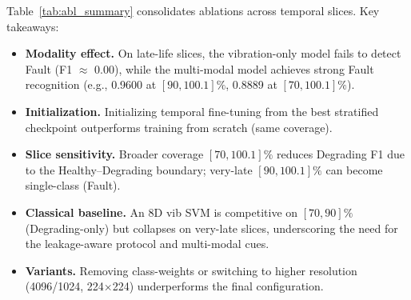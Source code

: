 \documentclass[pdflatex,sn-mathphys-num]{sn-jnl}%
\begin{document}
Table~\ref{tab:abl_summary} consolidates ablations across temporal slices. Key takeaways:
\begin{itemize}
  \item \textbf{Modality effect.} On late-life slices, the vibration-only model fails to detect Fault (F1 $\approx$ 0.00), while the multi-modal model achieves strong Fault recognition (e.g., 0.9600 at $[90,100.1]\%$, 0.8889 at $[70,100.1]\%$).
  \item \textbf{Initialization.} Initializing temporal fine-tuning from the best stratified checkpoint outperforms training from scratch (same coverage).
  \item \textbf{Slice sensitivity.} Broader coverage $[70,100.1]\%$ reduces Degrading F1 due to the Healthy--Degrading boundary; very-late $[90,100.1]\%$ can become single-class (Fault).
  \item \textbf{Classical baseline.} An 8D vib SVM is competitive on $[70,90]\%$ (Degrading-only) but collapses on very-late slices, underscoring the need for the leakage-aware protocol and multi-modal cues.
  \item \textbf{Variants.} Removing class-weights or switching to higher resolution (4096/1024, 224$\times$224) underperforms the final configuration.
\end{itemize}
\end{document}
